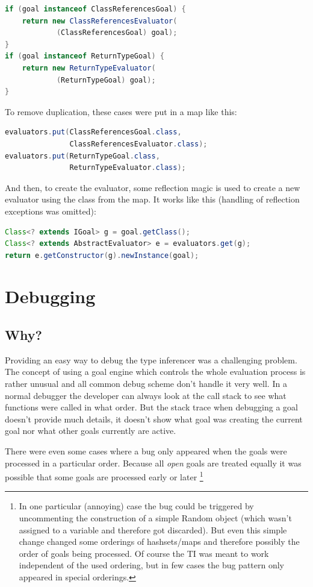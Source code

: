 \documentclass[12pt,halfparskip,DIV11,BCOR10mm]{scrreprt}
\begin{document}
\begin{lstlisting}[language=java]
if (goal instanceof ClassReferencesGoal) {
    return new ClassReferencesEvaluator(
            (ClassReferencesGoal) goal);
}
if (goal instanceof ReturnTypeGoal) {
    return new ReturnTypeEvaluator(
            (ReturnTypeGoal) goal);
}
\end{lstlisting}

To remove duplication, these cases were put in a map like this:

\begin{lstlisting}[language=java]
evaluators.put(ClassReferencesGoal.class,
               ClassReferencesEvaluator.class);
evaluators.put(ReturnTypeGoal.class,
               ReturnTypeEvaluator.class);
\end{lstlisting}

And then, to create the evaluator, some reflection magic is used to create a new evaluator using the class from the map. It works like this (handling of reflection exceptions was omitted):

\begin{lstlisting}[language=java]
Class<? extends IGoal> g = goal.getClass();
Class<? extends AbstractEvaluator> e = evaluators.get(g);
return e.getConstructor(g).newInstance(goal);
\end{lstlisting}


\section{Debugging}

\subsection{Why?}

Providing an easy way to debug the type inferencer was a challenging problem. The concept of using a goal engine which controls the whole evaluation process is rather unusual and all common debug scheme don't handle it very well. In a normal debugger the developer can always look at the call stack to see what functions were called in what order. But the stack trace when debugging a goal doesn't provide much details, it doesn't show what goal was creating the current goal nor what other goals currently are active.

There were even some cases where a bug only appeared when the goals were processed in a particular order. Because all \emph{open} goals are treated equally it was possible that some goals are processed early or later
\footnote{In one particular (annoying) case the bug could be triggered by uncommenting the construction of a simple Random object (which wasn't assigned to a variable and therefore got discarded). But even this simple change changed some orderings of hashsets/maps and therefore possibly the order of goals being processed. Of course the TI was meant to work independent of the used ordering, but in few cases the bug pattern only appeared in special orderings.}
\end{document}
